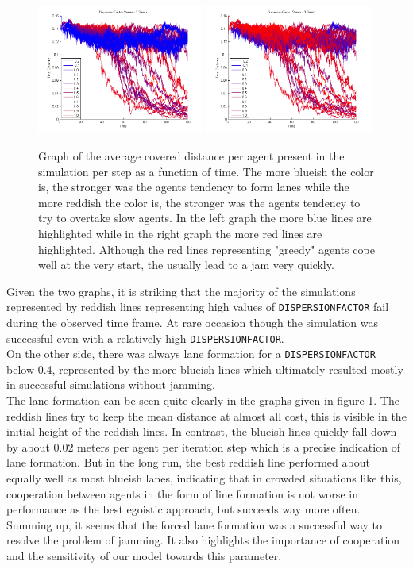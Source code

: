 \begin{figure}[h!]
	\centering
		\includegraphics[width=0.49\textwidth]{pictures/AAllInOneColorsBlue.png}
		\includegraphics[width=0.49\textwidth]{pictures/AAllInOneColorsRed.png}
	\caption{Graph of the average covered distance per agent present in the simulation per step as a function of time. The more blueish the color is, the stronger was the agents tendency to form lanes while the more reddish the color is, the stronger was the agents tendency to try to overtake slow agents. In the left graph the more blue lines are highlighted while in the right graph the more red lines are highlighted. Although the red lines representing "greedy" agents cope well at the very start, the usually lead to a jam very quickly.}
	\label{fig:AAllInOne}
\end{figure}

\noi Given the two graphs, it is striking that the majority of the simulations represented by reddish lines representing high values of \texttt{DISPERSIONFACTOR} fail during the observed time frame. At rare occasion though the simulation was successful even with a relatively high \texttt{DISPERSIONFACTOR}.\\
On the other side, there was always lane formation for a \texttt{DISPERSIONFACTOR} below 0.4, represented by the more blueish lines which ultimately resulted mostly in successful simulations without jamming.\\
The lane formation can be seen quite clearly in the graphs given in figure \ref{fig:AAllInOne}. The reddish lines try to keep the mean distance at almost all cost, this is visible in the initial height of the reddish lines. In contrast, the blueish lines quickly fall down by about 0.02 meters per agent per iteration step which is a precise indication of lane formation. But in the long run, the best reddish line performed about equally well as most blueish lanes, indicating that in crowded situations like this, cooperation between agents in the form of line formation is not worse in performance as the best egoistic approach, but succeeds way more often.\\

\noi Summing up, it seems that the forced lane formation was a successful way to resolve the problem of jamming. It also highlights the importance of cooperation and the sensitivity of our model towards this parameter.

